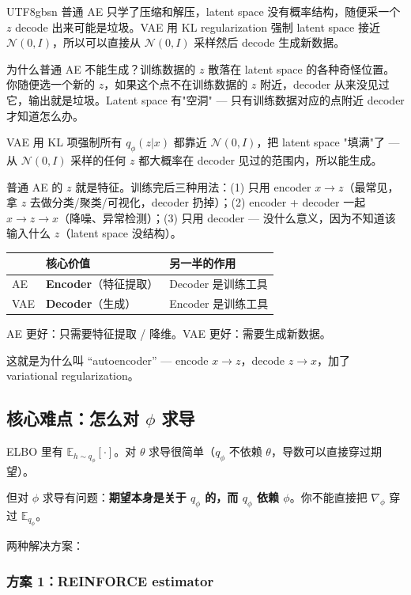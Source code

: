 \documentclass[11pt]{article}
\begin{document}
\begin{CJK}{UTF8}{gbsn}
普通 AE 只学了压缩和解压，latent space 没有概率结构，随便采一个 $z$ decode 出来可能是垃圾。VAE 用 KL regularization 强制 latent space 接近 $\mathcal{N}(0, I)$，所以可以直接从 $\mathcal{N}(0, I)$ 采样然后 decode 生成新数据。

为什么普通 AE 不能生成？训练数据的 $z$ 散落在 latent space 的各种奇怪位置。你随便选一个新的 $z$，如果这个点不在训练数据的 $z$ 附近，decoder 从来没见过它，输出就是垃圾。Latent space 有"空洞" --- 只有训练数据对应的点附近 decoder 才知道怎么办。

VAE 用 KL 项强制所有 $q_\phi(z|x)$ 都靠近 $\mathcal{N}(0, I)$，把 latent space "填满"了 --- 从 $\mathcal{N}(0, I)$ 采样的任何 $z$ 都大概率在 decoder 见过的范围内，所以能生成。

普通 AE 的 $z$ 就是特征。训练完后三种用法：(1) 只用 encoder $x \to z$（最常见，拿 $z$ 去做分类/聚类/可视化，decoder 扔掉）；(2) encoder + decoder 一起 $x \to z \to \hat{x}$（降噪、异常检测）；(3) 只用 decoder --- 没什么意义，因为不知道该输入什么 $z$（latent space 没结构）。

\begin{center}
\begin{tabular}{l|l|l}
  & \textbf{核心价值} & \textbf{另一半的作用} \\
  \hline
  AE & \textbf{Encoder}（特征提取） & Decoder 是训练工具 \\
  VAE & \textbf{Decoder}（生成） & Encoder 是训练工具 \\
\end{tabular}
\end{center}

AE 更好：只需要特征提取 / 降维。VAE 更好：需要生成新数据。

这就是为什么叫 ``autoencoder'' --- encode $x \to z$，decode $z \to x$，加了 variational regularization。

\subsection{核心难点：怎么对 $\phi$ 求导}

ELBO 里有 $\mathbb{E}_{h \sim q_\phi}[\cdot]$。对 $\theta$ 求导很简单（$q_\phi$ 不依赖 $\theta$，导数可以直接穿过期望）。

但对 $\phi$ 求导有问题：\textbf{期望本身是关于 $q_\phi$ 的，而 $q_\phi$ 依赖 $\phi$}。你不能直接把 $\nabla_\phi$ 穿过 $\mathbb{E}_{q_\phi}$。

两种解决方案：

\subsubsection{方案 1：REINFORCE estimator}


\end{CJK}
\end{document}
